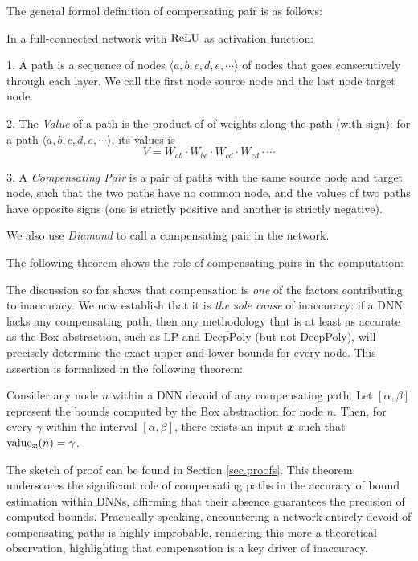 The general formal definition of compensating pair is as follows:

\begin{definition} In a full-connected network with $\mathrm{ReLU}$ as activation function:
	
	1. A path is a sequence of nodes $\langle a,b,c,d,e,\cdots\rangle$ of nodes that goes consecutively through each layer. We call the first node source node and the last node target node.  
	
	2. The \emph{Value} of a path is the product of of weights along the path (with sign): for a path $\langle a,b,c,d,e,\cdots\rangle$, its values is $$V = W_{ab}\cdot W_{bc}\cdot W_{cd}\cdot W_{ed}\cdot \cdots$$
	
	3. A \emph{Compensating Pair} is a pair of paths with the same source node and target node, such that the two paths have no common node, and the values of two paths have opposite signs (one is strictly positive and another is strictly negative).
	
	We also use \emph{Diamond} to call a compensating pair in the network.
\end{definition}

The following theorem shows the role of compensating pairs in the computation:

\fi

\smallskip

The discussion so far shows  that compensation is {\em one} of the factors contributing to inaccuracy. We now establish that it is {\em the sole cause} of inaccuracy:
if a DNN lacks any compensating path, then any methodology that is at least as accurate as the Box abstraction, such as LP and $\overline{\mbox{DeepPoly}}$ (but not DeepPoly), will precisely determine the exact upper and lower bounds for every node. This assertion is formalized in the following theorem:

\begin{theorem}
	\label{th1}
	Consider any node $n$ within a DNN devoid of any compensating path. Let $[\alpha,\beta]$ represent the bounds computed by the Box abstraction for node $n$. Then, for every $\gamma$ within the interval $[\alpha,\beta]$, there exists an input $\boldsymbol{x}$ such that ${\textrm{value}}_{\boldsymbol{x}}(n) = \gamma$.
\end{theorem}

The sketch of proof can be found in Section \ref{sec.proofs}. 
This theorem underscores the significant role of compensating paths in the accuracy of bound estimation within DNNs, affirming that their absence guarantees the precision of computed bounds. Practically speaking, encountering a network entirely devoid of compensating paths is highly improbable, rendering this more a theoretical observation, highlighting that compensation is a key driver of inaccuracy.


